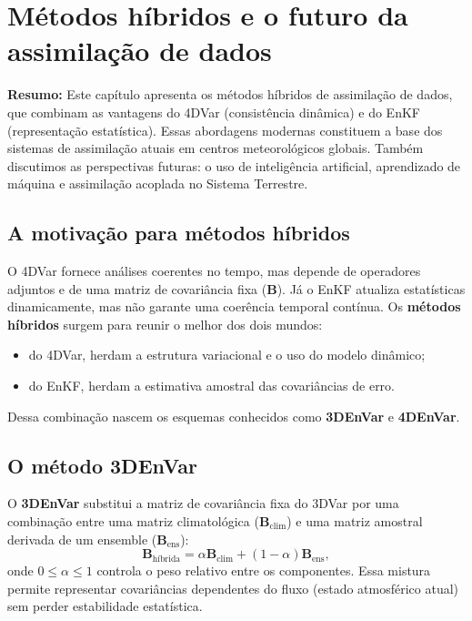 \chapter{Métodos híbridos e o futuro da assimilação de dados}
\label{ch:hibridos}

\noindent\textbf{Resumo:}
Este capítulo apresenta os métodos híbridos de assimilação de dados, que combinam as vantagens do 4DVar (consistência dinâmica) e do EnKF (representação estatística).  
Essas abordagens modernas constituem a base dos sistemas de assimilação atuais em centros meteorológicos globais.  
Também discutimos as perspectivas futuras: o uso de inteligência artificial, aprendizado de máquina e assimilação acoplada no Sistema Terrestre.

\section{A motivação para métodos híbridos}
O 4DVar fornece análises coerentes no tempo, mas depende de operadores adjuntos e de uma matriz de covariância fixa ($\mathbf{B}$).  
Já o EnKF atualiza estatísticas dinamicamente, mas não garante uma coerência temporal contínua.  
Os \textbf{métodos híbridos} surgem para reunir o melhor dos dois mundos:
\begin{itemize}
  \item do 4DVar, herdam a estrutura variacional e o uso do modelo dinâmico;
  \item do EnKF, herdam a estimativa amostral das covariâncias de erro.
\end{itemize}

Dessa combinação nascem os esquemas conhecidos como \textbf{3DEnVar} e \textbf{4DEnVar}.

\section{O método 3DEnVar}
O \textbf{3DEnVar} substitui a matriz de covariância fixa do 3DVar por uma combinação entre uma matriz climatológica ($\mathbf{B}_{\text{clim}}$) e uma matriz amostral derivada de um ensemble ($\mathbf{B}_{\text{ens}}$):
\begin{equation}
\mathbf{B}_{\text{híbrida}} = \alpha \mathbf{B}_{\text{clim}} + (1 - \alpha)\mathbf{B}_{\text{ens}},
\label{eq:bhibrida}
\end{equation}
onde $0 \leq \alpha \leq 1$ controla o peso relativo entre os componentes.  
Essa mistura permite representar covariâncias dependentes do fluxo (estado atmosférico atual) sem perder estabilidade estatística.


